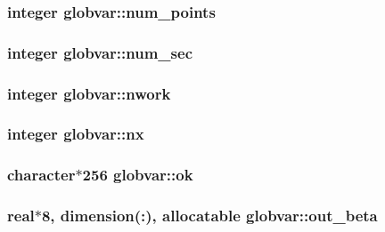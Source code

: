 \subsubsection[{num\+\_\+points}]{\setlength{\rightskip}{0pt plus 5cm}integer globvar\+::num\+\_\+points}\label{namespaceglobvar_a32ba7d06170614a028f4f4a10dd42764}
\hypertarget{namespaceglobvar_a0095cc9c0afc3e8507882537e5702411}{}
\subsubsection[{num\+\_\+sec}]{\setlength{\rightskip}{0pt plus 5cm}integer globvar\+::num\+\_\+sec}\label{namespaceglobvar_a0095cc9c0afc3e8507882537e5702411}
\hypertarget{namespaceglobvar_a14eadfde6f84c7aec720cf0c0e828e3a}{}
\subsubsection[{nwork}]{\setlength{\rightskip}{0pt plus 5cm}integer globvar\+::nwork}\label{namespaceglobvar_a14eadfde6f84c7aec720cf0c0e828e3a}
\hypertarget{namespaceglobvar_ae4d2e4d1bd4180999afe29337165e1e6}{}
\subsubsection[{nx}]{\setlength{\rightskip}{0pt plus 5cm}integer globvar\+::nx}\label{namespaceglobvar_ae4d2e4d1bd4180999afe29337165e1e6}
\hypertarget{namespaceglobvar_a61ebbf94ac2ff67042612526d08b69f5}{}
\subsubsection[{ok}]{\setlength{\rightskip}{0pt plus 5cm}character$\ast$256 globvar\+::ok}\label{namespaceglobvar_a61ebbf94ac2ff67042612526d08b69f5}
\hypertarget{namespaceglobvar_ac973fc13b42ddc6cb1c35762966c4f96}{}
\subsubsection[{out\+\_\+beta}]{\setlength{\rightskip}{0pt plus 5cm}real$\ast$8, dimension(\+:), allocatable globvar\+::out\+\_\+beta}\label{namespaceglobvar_ac973fc13b42ddc6cb1c35762966c4f96}
\hypertarget{namespaceglobvar_a07729166d5dd2b6a73e99fa9f7f4c3fc}{}
